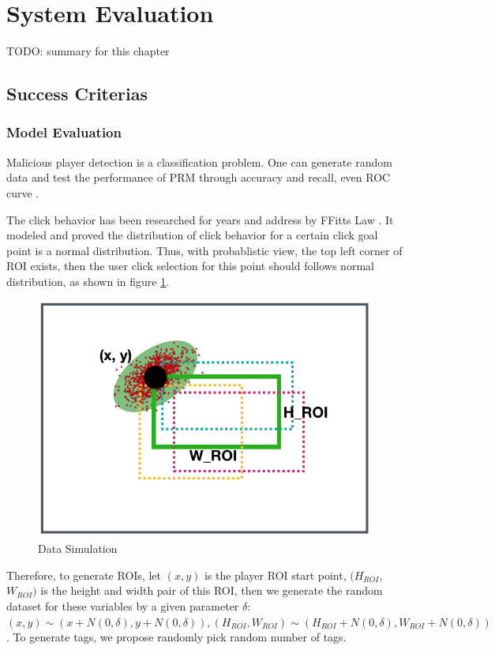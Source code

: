 \section{System Evaluation}

TODO: summary for this chapter

\subsection{Success Criterias}

\subsubsection{Model Evaluation}

Malicious player detection is a classification problem. 
One can generate random data and test the performance of PRM through accuracy and recall, even ROC curve \cite{hanley1982meaning}.

The click behavior has been researched for years and address by FFitts Law \cite{bi2013ffitts}.
It modeled and proved the distribution of click behavior for a certain click goal point is a normal distribution.
Thus, with probablistic view, the top left corner of ROI exists, then the user click selection 
for this point should follows normal distribution, as shown in figure \ref{fig:evaluation}.

\begin{figure}[htp]
\centering
\includegraphics[width=0.5\columnwidth]{figures/evaluation}
\caption{Data Simulation}
\label{fig:evaluation}
\end{figure}

Therefore, to generate ROIs, let $(x, y)$ is the player ROI start point,  $(H_{ROI}$, $W_{ROI})$ is the height
and width pair of this ROI, then we generate the random dataset for these variables by a given
parameter $\delta$: $(x, y) \sim (x+N(0, \delta), y+N(0, \delta)), (H_{ROI}, W_{ROI}) \sim (H_{ROI}+N(0, \delta), W_{ROI}+N(0, \delta))$.
To generate tags, we propose randomly pick random number of tags.

